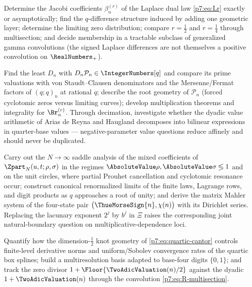\documentclass[11pt,oneside]{article}
\numberwithin{equation}{section}
\theoremstyle{definition}
\theoremstyle{remark}
\begin{document}
\begin{problem}
Determine the Jacobi coefficients $\beta_n^{(r)}$ of the Laplace dual law
\eqref{p7:eq:Lr} exactly or asymptotically; find the $q$-difference structure
induced by adding one geometric layer; determine the limiting zero
distribution; compare $r=\tfrac12$ and $r=\tfrac14$ through multisection;
and decide membership in a tractable subclass of generalized gamma
convolutions (the signed Laplace differences are not themselves a positive
convolution on $\RealNumbers_+$).
\end{problem}

\begin{problem}
Find the least $D_n$ with $D_n\mathcal P_n\in\IntegerNumbers[q]$ and compare its prime
valuations with von Staudt--Clausen denominators and the Mersenne/Fermat
factors of $(q;q)_n$ at rational $q$; describe the root geometry of
$\mathcal P_n$ (forced cyclotomic zeros versus limiting curves); develop
multiplication theorems and integrality for $\Br_n^{(r)}$.  Through
decimation, investigate whether the dyadic value arithmetic of Arias de
Reyna and Haugland decomposes into bilinear expressions in quarter-base
values --- negative-parameter value questions reduce affinely and should
never be duplicated.
\end{problem}

\begin{problem}
Carry out the $N\to\infty$ saddle analysis of the mixed coefficients of
$\Zpart_N(u,t;\rho,\sigma)$ in the regimes $\AbsoluteValue\rho,\AbsoluteValue\sigma\lessgtr1$ and
on the unit circles, where partial Prouhet cancellation and cyclotomic
resonance occur; construct canonical renormalized limits of the finite laws,
Lagrange rows, and digit products as $q$ approaches a root of unity; and
derive the matrix Mahler system of the four-state pair
$\bigl(\ThueMorseSign{n},\chi(n)\bigr)$ with its Dirichlet series.  Replacing the
lacunary exponent $2^j$ by $b^j$ in $\Xi$ raises the corresponding
joint natural-boundary question on multiplicative-dependence loci.
\end{problem}

\begin{problem}
Quantify how the dimension-$\tfrac12$ knot geometry of
\eqref{p7:eq:quartic-cantor} controls finite-level derivative norms and
uniform/Sobolev convergence rates of the quartic box splines; build a
multiresolution basis adapted to base-four digits $\{0,1\}$; and track the
zero divisor $1+\Floor{\TwoAdicValuation(n)/2}$ against the dyadic $1+\TwoAdicValuation(n)$ through
the convolution \eqref{p7:eq:R-multisection}.
\end{problem}
\end{document}

